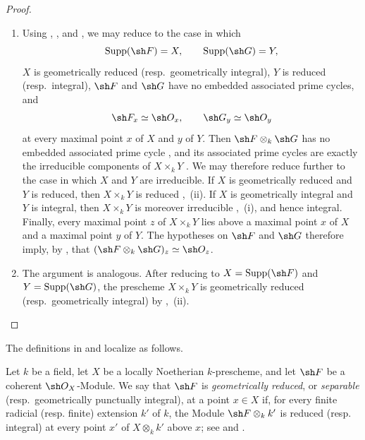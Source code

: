 \begin{proof}
\begin{enumerate}
\item[\rm(i)]
Using , , and
, we may reduce to the case in which
\[
 \operatorname{Supp}(\sh F)=X,\qquad
 \operatorname{Supp}(\sh G)=Y,
\]
$X$ is geometrically reduced (resp.\ geometrically integral), $Y$ is
reduced (resp.\ integral), $\sh F$ and $\sh G$ have no embedded
associated prime cycles, and
\[
 \sh F_x\simeq\sh O_x,\qquad
 \sh G_y\simeq\sh O_y
\]
at every maximal point $x$ of $X$ and $y$ of $Y$.
Then $\sh F\otimes_k\sh G$ has no embedded associated prime cycle
, and its associated prime cycles are exactly the
irreducible components of $X\times_kY$ .
We may therefore reduce further to the case in which $X$ and $Y$ are
irreducible.
If $X$ is geometrically reduced and $Y$ is reduced, then
$X\times_kY$ is reduced ,~(ii).
If $X$ is geometrically integral and $Y$ is integral, then
$X\times_kY$ is moreover irreducible ,~(i), and hence
integral.
Finally, every maximal point $z$ of $X\times_kY$ lies above a maximal
point $x$ of $X$ and a maximal point $y$ of $Y$.
The hypotheses on $\sh F$ and $\sh G$ therefore imply, by
, that
$(\sh F\otimes_k\sh G)_z\simeq\sh O_z$.

\item[\rm(ii)]
The argument is analogous.
After reducing to
$X=\operatorname{Supp}(\sh F)$ and
$Y=\operatorname{Supp}(\sh G)$, the prescheme $X\times_kY$ is
geometrically reduced (resp.\ geometrically integral) by
,~(ii).
\end{enumerate}
\end{proof}

The definitions in  and  localize as
follows.

\begin{definition}[4.6.22]
\label{IV.4.6.22}
Let $k$ be a field, let $X$ be a locally Noetherian $k$-prescheme,
and let $\sh F$ be a coherent $\sh O_X$-Module.
We say that $\sh F$ is \emph{geometrically reduced}, or
\emph{separable} \textup{(resp.\ geometrically punctually integral)},
at a point $x\in X$ if, for every finite radicial
\textup{(resp.} finite) extension $k'$ of $k$, the Module
$\sh F\otimes_k k'$ is reduced \textup{(resp.} integral) at every point $x'$
of $X\otimes_k k'$ above $x$; see  and
.
\end{definition}

